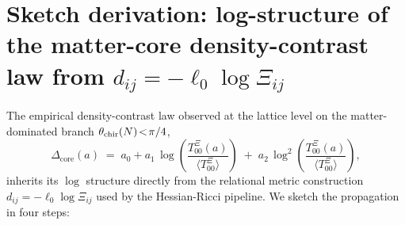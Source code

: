 %

\section*{Sketch derivation: log-structure of the matter-core
density-contrast law from $d_{ij}=-\ell_{0}\log\Xi_{ij}$}

The empirical density-contrast law observed at the lattice
level on the matter-dominated branch
$\theta_{\rm chir}(N)\!<\!\pi/4$,
\begin{equation}
\Delta_{\mathrm{core}}(a) \;=\; a_{0} + a_{1}\,
\log\!\left(\frac{T_{00}^{\Xi}(a)}{\langle T_{00}^{\Xi}\rangle}\right)
\;+\; a_{2}\,\log^{2}\!\left(\frac{T_{00}^{\Xi}(a)}{\langle T_{00}^{\Xi}\rangle}\right),
\tag{$\star$}
\end{equation}
inherits its $\log$ structure directly from the relational
metric construction $d_{ij}=-\ell_{0}\log\Xi_{ij}$ used by the
Hessian-Ricci pipeline. We sketch the propagation in four steps:

